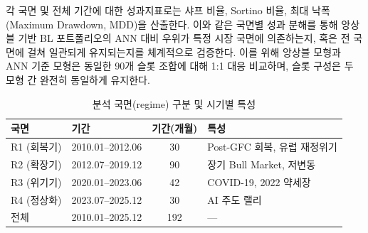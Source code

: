 \documentclass{article}
\begin{document}
각 국면 및 전체 기간에 대한 성과지표로는 샤프 비율, Sortino 비율, 최대 낙폭(Maximum Drawdown, MDD)을 산출한다. 이와 같은 국면별 성과 분해를 통해 앙상블 기반 BL 포트폴리오의 ANN 대비 우위가 특정 시장 국면에 의존하는지, 혹은 전 국면에 걸쳐 일관되게 유지되는지를 체계적으로 검증한다. 이를 위해 앙상블 모형과 ANN 기준 모형은 동일한 90개 슬롯 조합에 대해 1:1 대응 비교하며, 슬롯 구성은 두 모형 간 완전히 동일하게 유지한다.

\begin{table}[ht]
\centering
\caption{분석 국면(regime) 구분 및 시기별 특성}
\label{tab:regimes}
\begin{tabular}{llcl}
\toprule
국면 & 기간 & 기간(개월) & 특성 \\
\midrule
R1 (회복기)  & 2010.01--2012.06 & 30 & Post-GFC 회복, 유럽 재정위기 \\
R2 (확장기)  & 2012.07--2019.12 & 90 & 장기 Bull Market, 저변동 \\
R3 (위기기)  & 2020.01--2023.06 & 42 & COVID-19, 2022 약세장 \\
R4 (정상화)  & 2023.07--2025.12 & 30 & AI 주도 랠리 \\
\midrule
\multicolumn{1}{l}{전체} & 2010.01--2025.12 & 192 & --- \\
\bottomrule
\end{tabular}
\end{table}




\end{document}
